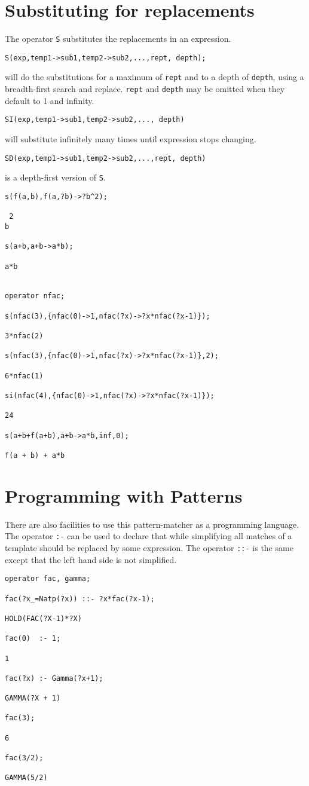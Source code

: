 \section{Substituting for replacements}

The operator {\tt S} substitutes the replacements in an
expression.

{\tt S(exp,{temp1->sub1,temp2->sub2,...},rept, depth);}

will do the substitutions for a maximum of {\tt rept} and to a depth of
{\tt depth}, using a breadth-first search and replace.  {\tt rept} and
{\tt depth} may be omitted when they default to 1 and infinity.

{\tt SI(exp,{temp1->sub1,temp2->sub2,...}, depth)}

will substitute  infinitely many times until  expression  stops
changing.

{\tt SD(exp,{temp1->sub1,temp2->sub2,...},rept, depth)}

is a depth-first version of {\tt S}.


\begin{verbatim}
s(f(a,b),f(a,?b)->?b^2);

 2
b

s(a+b,a+b->a*b);

a*b


operator nfac;

s(nfac(3),{nfac(0)->1,nfac(?x)->?x*nfac(?x-1)});

3*nfac(2)

s(nfac(3),{nfac(0)->1,nfac(?x)->?x*nfac(?x-1)},2);

6*nfac(1)

si(nfac(4),{nfac(0)->1,nfac(?x)->?x*nfac(?x-1)});

24

s(a+b+f(a+b),a+b->a*b,inf,0);

f(a + b) + a*b

\end{verbatim}


\section{Programming with Patterns}

There are also facilities to use this pattern-matcher as a programming
language.  The operator {\tt :-}\ttindex{:-} can be used  to declare
that while simplifying all matches of a template should be replaced by
some expression.  The operator {\tt ::-} is the same except that the
left hand side is not simplified.

\begin{verbatim}
operator fac, gamma;

fac(?x_=Natp(?x)) ::- ?x*fac(?x-1);

HOLD(FAC(?X-1)*?X)

fac(0)  :- 1;

1

fac(?x) :- Gamma(?x+1);

GAMMA(?X + 1)

fac(3);

6

fac(3/2);

GAMMA(5/2)
\end{verbatim}

